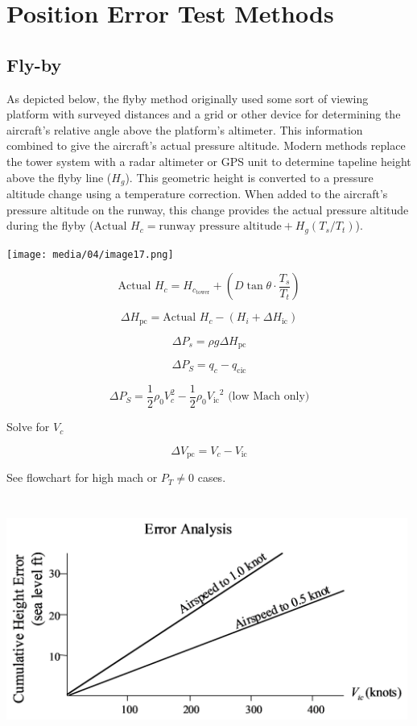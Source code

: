 \documentclass[
]{book}
\begin{document}
\hypertarget{position-error-test-methods}{%
\section{Position Error Test Methods}\label{position-error-test-methods}}

\hypertarget{fly-by}{%
\subsection{Fly-by}\label{fly-by}}

As depicted below, the flyby method originally used some sort of viewing platform with surveyed distances and a grid or other device for determining the aircraft's relative angle above the platform's altimeter. This information combined to give the aircraft's actual pressure altitude. Modern methods replace the tower system with a radar altimeter or GPS unit to determine tapeline height above the flyby line (\(H_g\)). This geometric height is converted to a pressure altitude change using a temperature correction. When added to the aircraft's pressure altitude on the runway, this change provides the actual pressure altitude during the flyby (\(\textrm{Actual } H_c = \textrm{runway pressure altitude} + H_g (T_s/T_t)\)).

\texttt{[image: media/04/image17.png]}

\[\text{Actual } H_{c} = H_{c_{\mathrm{tower}}} + \left( D\tan\theta \cdot \frac{T_{s}}{T_{t}} \right) \]

\[ \Delta H_{\mathrm{pc}} = \text{Actual } H_c - \left( H_i + \Delta H_{\mathrm{ic}} \right) \]

\[ \Delta P_s = \rho g \Delta H_{\mathrm{pc}} \]

\[ \Delta P_{S} = q_{c} - q_{\mathrm{cic}} \]

\[ \Delta P_{S} = \frac{1}{2}\rho_{0}{V_{c}^{2} - \frac{1}{2}\rho_{0}{V_{\mathrm{ic}}}^{2} \text{ (low Mach only)}} \]

Solve for \(V_c\)

\[ \Delta V_{\mathrm{pc}} = V_c - V_{\mathrm{ic}} \]

See flowchart for high mach or \(P_T \ne 0\) cases.

\includegraphics[width=5.1875in,height=3.15in]{media/04/image18.svg}
\end{document}
